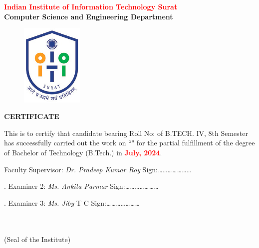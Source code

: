 \thispagestyle{plain}

\begin{center}
{\Large {\textbf {\textcolor{red}{Indian Institute of Information Technology Surat}\\Computer Science and Engineering Department}}}
\end{center}

\vspace{1.25cm}
\justify


\begin{figure}[h]
    \centering
    \includegraphics[width=30mm]{Formalities/IIIT_Surat_logo}\label{fig:figure}
\end{figure}

\begin{center}
{\Large {\textbf \uppercase{Certificate}}}
\end{center}
\vspace{1.5cm}
\normalsize
\noindent This is to certify that candidate \textcolor{red}{\textbf{\myname}} bearing Roll No: \textcolor{red}{\textbf{\myrollno}} of B.TECH. IV, 8th Semester has successfully carried out the work on  ``\textcolor{red}{\textbf{\myprojectname}}" for the partial fulfillment of the degree of Bachelor of Technology (B.Tech.) in \textcolor{red}{\textbf{July, 2024}}.

\vspace{3\baselineskip}

\noindent Faculty Supervisor: \emph{Dr. Pradeep Kumar Roy}   \hfill Sign:\emph{…………………}\\
\vspace{1cm}

.  Examiner 2: \emph{Ms.  Ankita Parmar} \hfill Sign:\emph{…………………}\\
\vspace{0.3cm}

.  Examiner 3: \emph{ Ms. Jiby} T C \hfill Sign:\emph{…………………}\\
\vspace{0.3cm}

\begin{flushright} 

{\small \bf \textcolor{white}{}}\\
{\small \bf \textcolor{white}{}}\\
{\small (Seal of the Institute)} \\
\end{flushright}



